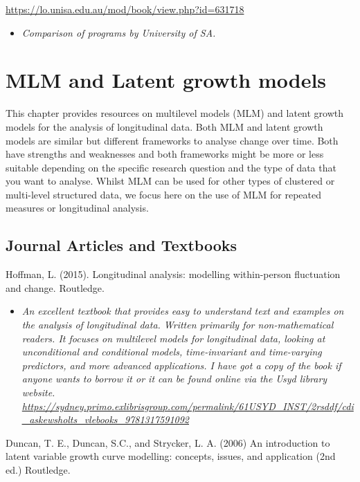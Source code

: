 \documentclass[
]{book}
\providecommand{\tightlist}{%
  \setlength{\itemsep}{0pt}\setlength{\parskip}{0pt}}
\begin{document}
\url{https://lo.unisa.edu.au/mod/book/view.php?id=631718}

\begin{itemize}
\tightlist
\item
  \emph{Comparison of programs by University of SA.}
\end{itemize}

\chapter{MLM and Latent growth models}\label{mlm-and-latent-growth-models}

This chapter provides resources on multilevel models (MLM) and latent growth models for the analysis of longitudinal data. Both MLM and latent growth models are similar but different frameworks to analyse change over time. Both have strengths and weaknesses and both frameworks might be more or less suitable depending on the specific research question and the type of data that you want to analyse. Whilst MLM can be used for other types of clustered or multi-level structured data, we focus here on the use of MLM for repeated measures or longitudinal analysis.

\section{Journal Articles and Textbooks}\label{journal-articles-and-textbooks-2}

Hoffman, L. (2015). Longitudinal analysis: modelling within-person fluctuation and change. Routledge.

\begin{itemize}
\tightlist
\item
  \emph{An excellent textbook that provides easy to understand text and examples on the analysis of longitudinal data. Written primarily for non-mathematical readers. It focuses on multilevel models for longitudinal data, looking at unconditional and conditional models, time-invariant and time-varying predictors, and more advanced applications. I have got a copy of the book if anyone wants to borrow it or it can be found online via the Usyd library website. \url{https://sydney.primo.exlibrisgroup.com/permalink/61USYD_INST/2rsddf/cdi_askewsholts_vlebooks_9781317591092} }
\end{itemize}

Duncan, T. E., Duncan, S.C., and Strycker, L. A. (2006) An introduction to latent variable growth curve modelling: concepts, issues, and application (2nd ed.) Routledge.
\end{document}
